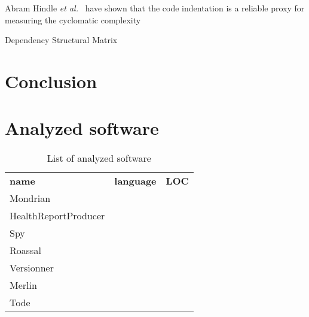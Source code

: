 \documentclass{sig-alternate}
\newcommand{\etal}{\emph{et al.}\xspace}
\newcommand{\seclabel}[1]{\label{sec:#1}}
\begin{document}
Abram Hindle \etal~\cite{Hind08a} have shown that the code indentation is a reliable proxy for measuring the cyclomatic complexity

Dependency Structural Matrix~\cite{Sang05a}

\section{Conclusion}\seclabel{conclusion}







\appendix

\section{Analyzed software} \seclabel{listOfSoftware}

\begin{table}
\begin{tabular}{|l|l|l|}\hline
\textbf{name} & \textbf{language} & \textbf{LOC}\\
Mondrian\\
HealthReportProducer\\
Spy\\
Roassal\\
Versionner\\
Merlin\\
Tode\\
\end{tabular}
\caption{List of analyzed software}
\end{table}
\end{document}
